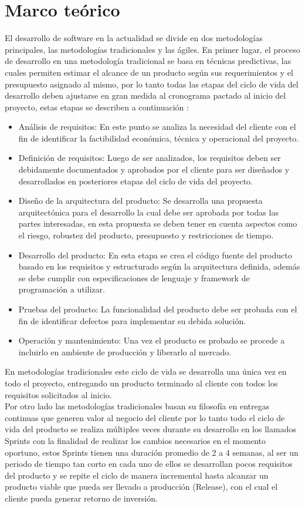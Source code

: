 \chapter*{Marco teórico}
El desarrollo de software en la actualidad se divide en dos metodologías principales, las metodologías tradicionales y las ágiles. En primer lugar, el proceso de desarrollo en una metodología tradicional se basa en técnicas predictivas, las cuales permiten estimar el alcance de un producto según sus requerimientos y el presupuesto asignado al mismo, por lo tanto todas las etapas del ciclo de vida del desarrollo deben ajustarse en gran medida al cronograma pactado al inicio del proyecto, estas etapas se describen a continuación \cite{Stoica2013}:
\begin{itemize}
	\item Análisis de requisitos: En este punto se analiza la necesidad del cliente con el fin de identificar la factibilidad económica, técnica y operacional del proyecto.
	\item Definición de requisitos: Luego de ser analizados, los requisitos deben ser debidamente documentados y aprobados por el cliente para ser diseñados y desarrollados en posteriores etapas del ciclo de vida del proyecto.
	\item Diseño de la arquitectura del producto: Se desarrolla una propuesta arquitectónica para el desarrollo la cual debe ser aprobada por todas las partes interesadas, en esta propuesta se deben tener en cuenta aspectos como el riesgo, robustez del producto, presupuesto y restricciones de tiempo.
	\item Desarrollo del producto: En esta etapa se crea el código fuente del producto basado en los requisitos y estructurado según la arquitectura definida, además se debe cumplir con especificaciones de lenguaje y framework de programación a utilizar.
	\item Pruebas del producto: La funcionalidad del producto debe ser probada con el fin de identificar defectos para implementar su debida solución.
	\item Operación y mantenimiento: Una vez el producto es probado se procede a incluirlo en ambiente de producción y liberarlo al mercado.
\end{itemize}  
En metodologías tradicionales este ciclo de vida se desarrolla una única vez en todo el proyecto, entregando un producto terminado al cliente con todos los requisitos solicitados al inicio.\\

Por otro lado las metodologías tradicionales basan su filosofía en entregas continuas que generen valor al negocio del cliente por lo tanto todo el ciclo de vida del producto se realiza múltiples veces durante su desarrollo en los llamados Sprints con la finalidad de realizar los cambios necesarios en el momento oportuno, estos Sprints tienen una duración promedio de 2 a 4 semanas, al ser un periodo de tiempo tan corto en cada uno de ellos se desarrollan pocos requisitos del producto y se repite el ciclo de manera incremental hasta alcanzar un producto viable que pueda ser llevado a producción (Release), con el cual el cliente pueda generar retorno de inversión.\\

